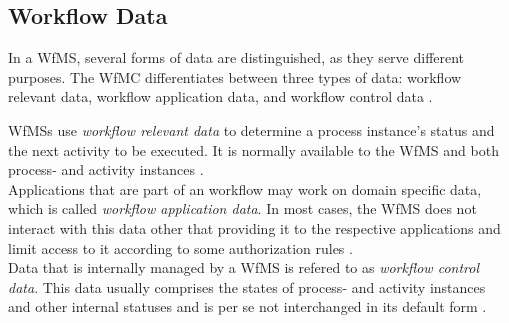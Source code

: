  \subsection{Workflow Data} %
  \label{sub:workflow_data}
    In a \ac{WfMS}, several forms of data are distinguished, as they serve different purposes. The \ac{WfMC} differentiates between three types of data: workflow relevant data, workflow application data, and workflow control data \cite{Hollingsworth1995WfMC}.

    \acp{WfMS} use \emph{workflow relevant data} to determine a process instance's status and the next activity to be executed. It is normally available to the \ac{WfMS} and both process- and activity instances \cite{Hollingsworth1995WfMC}. \\
    Applications that are part of an workflow may work on domain specific data, which is called \emph{workflow application data}. In most cases, the \ac{WfMS} does not interact with this data other that providing it to the respective applications and limit access to it according to some authorization rules \cite{Hollingsworth1995WfMC,Casati1999Specification}. \\
    Data that is internally managed by a \ac{WfMS} is refered to as \emph{workflow control data}. This data usually comprises the states of process- and activity instances and other internal statuses and is per se not interchanged in its default form \cite{Hollingsworth1995WfMC,Casati1999Specification}.


